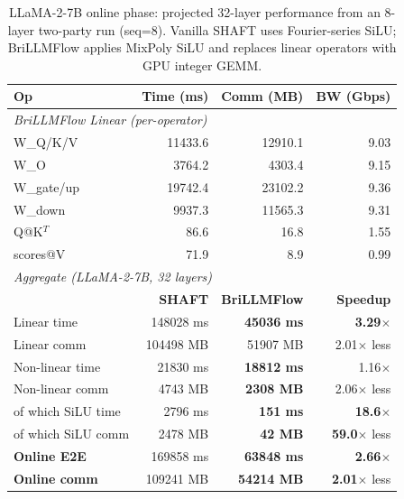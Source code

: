 \begin{table}[t]
\centering
\caption{LLaMA-2-7B online phase: projected 32-layer performance from an 8-layer two-party run (seq=8). Vanilla SHAFT uses Fourier-series SiLU; BriLLMFlow applies MixPoly SiLU and replaces linear operators with GPU integer GEMM.}
\label{tab:llama2_hybrid_comparison}
\setlength{\tabcolsep}{4pt}
\footnotesize
\begin{tabular}{lrrr}
\toprule
\textbf{Op} & \textbf{Time (ms)} & \textbf{Comm (MB)} & \textbf{BW (Gbps)} \\
\midrule
\multicolumn{4}{l}{\textit{BriLLMFlow Linear (per-operator)}} \\
W\_Q/K/V      & 11433.6 & 12910.1 & 9.03 \\
W\_O          & 3764.2 & 4303.4 & 9.15 \\
W\_gate/up    & 19742.4 & 23102.2 & 9.36 \\
W\_down       & 9937.3 & 11565.3 & 9.31 \\
Q@K$^T$       & 86.6 & 16.8 & 1.55 \\
scores@V      & 71.9 & 8.9 & 0.99 \\
\midrule
\multicolumn{4}{l}{\textit{Aggregate (LLaMA-2-7B, 32 layers)}} \\
                       & \textbf{SHAFT} & \textbf{BriLLMFlow} & \textbf{Speedup} \\
Linear time            & 148028 ms & \textbf{45036 ms} & \textbf{3.29}$\times$ \\
Linear comm            & 104498 MB & 51907 MB & 2.01$\times$ less \\
Non-linear time        & 21830 ms & \textbf{18812 ms} & 1.16$\times$ \\
Non-linear comm        & 4743 MB & \textbf{2308 MB} & 2.06$\times$ less \\
\quad of which SiLU time & 2796 ms & \textbf{151 ms} & \textbf{18.6}$\times$ \\
\quad of which SiLU comm & 2478 MB & \textbf{42 MB} & \textbf{59.0}$\times$ less \\
\midrule
\textbf{Online E2E}    & 169858 ms & \textbf{63848 ms} & \textbf{2.66}$\times$ \\
\textbf{Online comm}   & 109241 MB & \textbf{54214 MB} & \textbf{2.01}$\times$ less \\
\bottomrule
\end{tabular}
\end{table}
